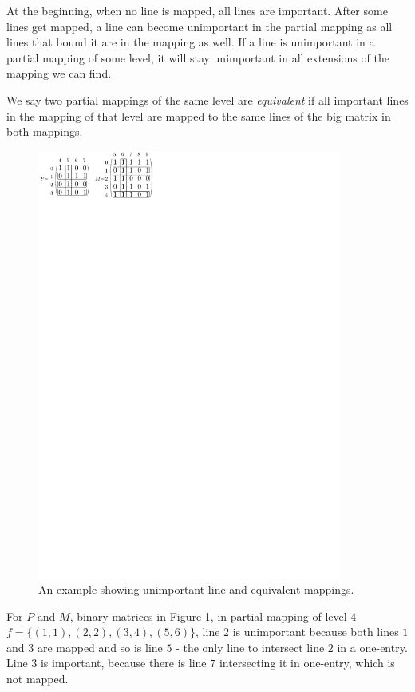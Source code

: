 At the beginning, when no line is mapped, all lines are important. After some lines get mapped, a line can become unimportant in the partial mapping as all lines that bound it are in the mapping as well. If a line is unimportant in a partial mapping of some level, it will stay unimportant in all extensions of the mapping we can find.
\begin{defn}
We say two partial mappings of the same level are \emph{equivalent} if all important lines in the mapping of that level are mapped to the same lines of the big matrix in both mappings.
\end{defn}
\begin{figure}[h!]
\centering
\includegraphics[width=100mm]{../img/equivalent.pdf}
\caption{An example showing unimportant line and equivalent mappings.}
\label{equivalent}
\end{figure}
For $P$ and $M$, binary matrices in Figure \ref{equivalent}, in partial mapping of level $4$ $f=\{(1,1),(2,2),(3,4),(5,6)\}$, line $2$ is unimportant because both lines $1$ and $3$ are mapped and so is line $5$ - the only line to intersect line $2$ in a one-entry. Line $3$ is important, because there is line $7$ intersecting it in one-entry, which is not mapped.

